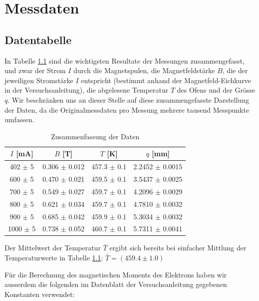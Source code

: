 \documentclass[a4paper,parskip,11pt, DIV12]{scrreprt}
\begin{document}
\clearpage

\chapter{Messdaten}

\section{Datentabelle}
In Tabelle \ref{tabelle1} sind die wichtigsten Resultate der Messungen zusammengefasst, und zwar der Strom $I$ durch die Magnetspulen, die Magnetfeldstärke $B$, die der jeweiligen Stromstärke $I$ entspricht (bestimmt anhand der Magnetfeld-Eichkurve in der Versuchsanleitung), die abgelesene Temperatur $T$ des Ofens und der Grösse $q$. Wir beschränken uns an dieser Stelle auf diese zusammengefasste Darstellung der Daten, da die Originalmessdaten pro Messung mehrere tausend Messpunkte umfassen. \\

\begin{table}[H]
\centering
\renewcommand{\arraystretch}{1.2} %
\setlength{\tabcolsep}{3mm} %
\begin{tabular}{|c|c|c|c|} 
$I$ [mA] & 			$B$ [T] & 					$T$ [K]  & 		$q$ [mm]\\ \hline
402   $\pm$ 5      & 0.306   $\pm$ 0.012   & 457.3  $\pm$ 0.1   & 2.2452 $\pm$ 0.0015 \\
600    $\pm$ 5      & 0.470   $\pm$ 0.021   & 459.5  $\pm$ 0.1   &3.5437  $\pm$ 0.0025\\
700    $\pm$ 5      & 0.549   $\pm$ 0.027  & 459.7   $\pm$ 0.1   &4.2096  $\pm$ 0.0029\\
800    $\pm$ 5     & 0.621    $\pm$ 0.034 & 459.7    $\pm$ 0.1   & 4.7810 $\pm$  0.0032 \\
900    $\pm$ 5     & 0.685    $\pm$ 0.042 & 459.9    $\pm$ 0.1    &5.3034  $\pm$  0.0032 \\
1000    $\pm$ 5    & 0.738     $\pm$ 0.052 & 460.7       $\pm$ 0.1 &5.7311  $\pm$ 0.0041
\end{tabular}
\caption[Daten]{Zusammenfassung der Daten}\label{tabelle1}
\end{table} Der Mittelwert der Temperatur $\bar{T}$ ergibt sich bereits bei einfacher Mittlung der Temperaturwerte in Tabelle \ref{tabelle1}: $\bar{T} = (459.4 \pm 1.0)$

Für die Berechnung des magnetischen Moments des Elektrons haben wir ausserdem die folgenden im Datenblatt der Versuchsanleitung gegebenen Konstanten verwendet:
\end{document}
